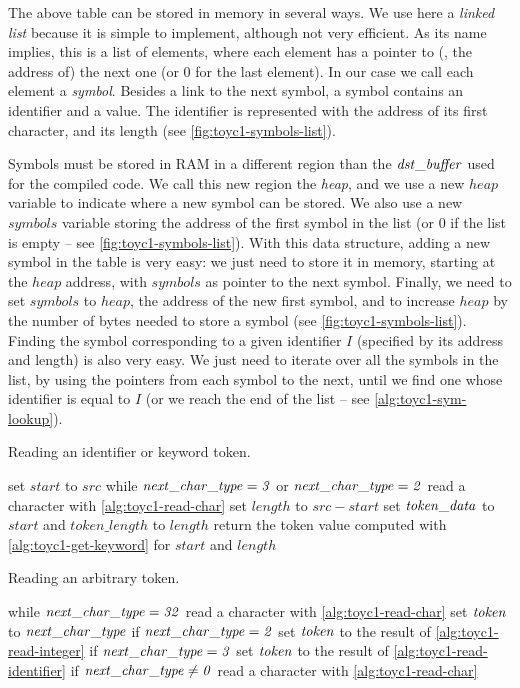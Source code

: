 The above table can be stored in memory in several ways. We use here a {\em
linked list} because it is simple to implement, although not very efficient. As
its name implies, this is a list of elements, where each element has a pointer
to (\ie, the address of) the next one (or 0 for the last element). In our case
we call each element a {\em symbol}. Besides a link to the next symbol, a
symbol contains an identifier and a value. The identifier is represented with
the address of its first character, and its length (see
\cref{fig:toyc1-symbols-list}).

Symbols must be stored in RAM in a different region than the $\it{dst\_buffer}$
used for the compiled code. We call this new region the {\em heap}, and we use
a new $heap$ variable to indicate where a new symbol can be stored. We also
use a new $symbols$ variable storing the address of the first symbol in the
list (or 0 if the list is empty -- see \cref{fig:toyc1-symbols-list}). With
this data structure, adding a new symbol in the table is very easy: we just
need to store it in memory, starting at the $heap$ address, with $symbols$ as
pointer to the next symbol. Finally, we need to set $symbols$ to $heap$, the
address of the new first symbol, and to increase $heap$ by the number of bytes
needed to store a symbol (see \cref{fig:toyc1-symbols-list}). Finding the
symbol corresponding to a given identifier $I$ (specified by its address and
length) is also very easy. We just need to iterate over all the symbols in the
list, by using the pointers from each symbol to the next, until we find one
whose identifier is equal to $I$ (or we reach the end of the list -- see
\cref{alg:toyc1-sym-lookup}).

\begin{Algorithm}
\caption{Reading an identifier or keyword
  token.}\label{alg:toyc1-read-identifier}
\begin{algorithmic}[1]
\State set $start$ to $src$
\Begin while $\it{next\_char\_type}=3$ or $\it{next\_char\_type}=2$
  \State read a character with \cref{alg:toyc1-read-char}
\End
\State set $length$ to $src-start$
\State set $\it{token\_data}$ to $start$ and $token\_length$ to $length$
\State return the token value computed with \cref{alg:toyc1-get-keyword} for
  $start$ and $length$
\end{algorithmic}
\end{Algorithm}

\begin{Algorithm}
\caption{Reading an arbitrary token.}\label{alg:toyc1-read-token}
\begin{algorithmic}[1]
\Begin while $\it{next\_char\_type}=32$
  \State read a character with \cref{alg:toyc1-read-char}
\End
\State set $\it{token}$ to $\it{next\_char\_type}$
\State if $\it{next\_char\_type}=2$ set $\it{token}$ to the result of
  \cref{alg:toyc1-read-integer}
\State if $\it{next\_char\_type}=3$ set $\it{token}$ to the result of
  \cref{alg:toyc1-read-identifier}
\State if $\it{next\_char\_type} \ne 0$ read a character with
  \cref{alg:toyc1-read-char}
\end{algorithmic}
\end{Algorithm}

